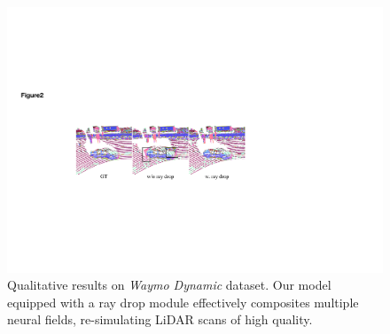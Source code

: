 \begin{figure}[t]
  \centering
   \includegraphics[width=1\linewidth]{Figures/intersectiontest.pdf}
   
   \caption{
   Qualitative results on \textit{Waymo Dynamic} dataset. Our model equipped with a ray drop module effectively composites multiple neural fields, re-simulating LiDAR scans of high quality.
   }
    
   \label{fig:ablation_raydrop}
\end{figure}